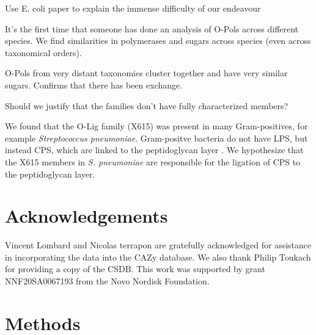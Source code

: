 \documentclass{article}
\begin{document}
Use E. coli paper to explain the immense difficulty of our endeavour \cite{iguchi_complete_2015}

It’s the first time that someone has done an analysis of O-Pols across different species. We find similarities in polymerases and sugars across species (even across taxonomical orders).

O-Pols from very distant taxonomies cluster together and have very similar sugars. Confirms that there has been exchange.

Should we justify that the families don’t have fully characterized members? %

We found that the O-Lig family (X615) was present in many Gram-positives, for example \textit{Streptococcus pneumoniae}. Gram-positve bacteria do not have LPS, but instead CPS, which are linked to the peptidoglycan layer \cite{paton_streptococcus_2019}. We hypothesize that the X615 members in \textit{S. pneumoniae} are responsible for the ligation of CPS to the peptidoglycan layer.





\section{Acknowledgements}
Vincent Lombard and Nicolas terrapon are gratefully acknowledged for assistance in incorporating the data into the CAZy database. We also thank Philip Toukach for providing a copy of the CSDB. This work was supported by grant NNF20SA0067193 from the Novo Nordisk Foundation.

\section{Methods}
\end{document}
